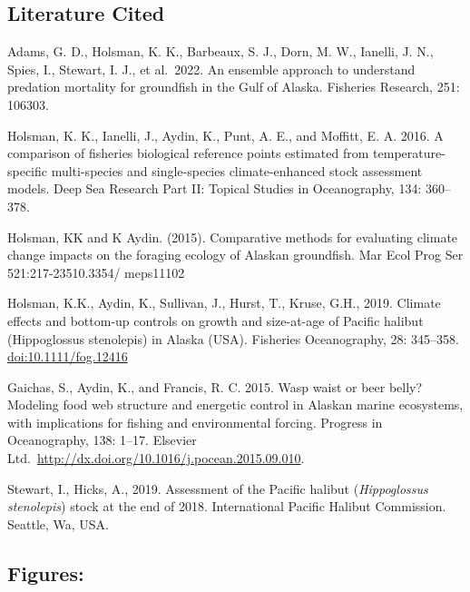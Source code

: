 \documentclass[
]{article}
\begin{document}
\hypertarget{literature-cited}{%
\subsection{Literature Cited}\label{literature-cited}}

Adams, G. D., Holsman, K. K., Barbeaux, S. J., Dorn, M. W., Ianelli, J.
N., Spies, I., Stewart, I. J., et al.~2022. An ensemble approach to
understand predation mortality for groundfish in the Gulf of Alaska.
Fisheries Research, 251: 106303.

Holsman, K. K., Ianelli, J., Aydin, K., Punt, A. E., and Moffitt, E. A.
2016. A comparison of fisheries biological reference points estimated
from temperature-specific multi-species and single-species
climate-enhanced stock assessment models. Deep Sea Research Part II:
Topical Studies in Oceanography, 134: 360--378.

Holsman, KK and K Aydin. (2015). Comparative methods for evaluating
climate change impacts on the foraging ecology of Alaskan groundfish.
Mar Ecol Prog Ser 521:217-23510.3354/ meps11102

Holsman, K.K., Aydin, K., Sullivan, J., Hurst, T., Kruse, G.H., 2019.
Climate effects and bottom-up controls on growth and size-at-age of
Pacific halibut (Hippoglossus stenolepis) in Alaska (USA). Fisheries
Oceanography, 28: 345--358. \url{doi:10.1111/fog.12416}

Gaichas, S., Aydin, K., and Francis, R. C. 2015. Wasp waist or beer
belly? Modeling food web structure and energetic control in Alaskan
marine ecosystems, with implications for fishing and environmental
forcing. Progress in Oceanography, 138: 1--17. Elsevier
Ltd.~\url{http://dx.doi.org/10.1016/j.pocean.2015.09.010}.

Stewart, I., Hicks, A., 2019. Assessment of the Pacific halibut
(\emph{Hippoglossus stenolepis}) stock at the end of 2018. International
Pacific Halibut Commission. Seattle, Wa, USA.

\newpage

\hypertarget{figures}{%
\subsection{Figures:}\label{figures}}
\end{document}
